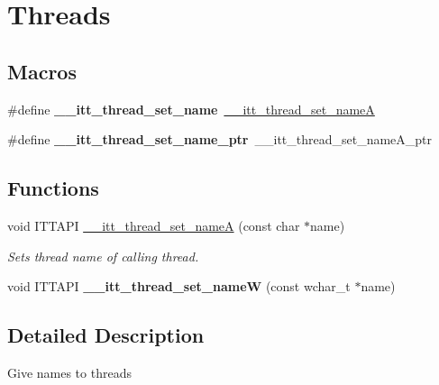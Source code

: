 \hypertarget{group__threads}{}\section{Threads}
\label{group__threads}
\subsection*{Macros}
\begin{DoxyCompactItemize}
\item 
\hypertarget{group__threads_gac8113cf8708e0d665fc9448a3e49c201}{}\#define {\bfseries \+\_\+\+\_\+itt\+\_\+thread\+\_\+set\+\_\+name}~\hyperlink{group__threads_ga9e8c213f65e14aef25280ed07df6c5e2}{\+\_\+\+\_\+itt\+\_\+thread\+\_\+set\+\_\+name\+A}\label{group__threads_gac8113cf8708e0d665fc9448a3e49c201}

\item 
\hypertarget{group__threads_ga995f602e830faca49bd119f4a1fe51d9}{}\#define {\bfseries \+\_\+\+\_\+itt\+\_\+thread\+\_\+set\+\_\+name\+\_\+ptr}~\+\_\+\+\_\+itt\+\_\+thread\+\_\+set\+\_\+name\+A\+\_\+ptr\label{group__threads_ga995f602e830faca49bd119f4a1fe51d9}

\end{DoxyCompactItemize}
\subsection*{Functions}
\begin{DoxyCompactItemize}
\item 
void I\+T\+T\+A\+P\+I \hyperlink{group__threads_ga9e8c213f65e14aef25280ed07df6c5e2}{\+\_\+\+\_\+itt\+\_\+thread\+\_\+set\+\_\+name\+A} (const char $\ast$name)
\begin{DoxyCompactList}\small\item\em Sets thread name of calling thread. \end{DoxyCompactList}\item 
\hypertarget{group__threads_gad5d4b8808f625466329f1145e80eb4be}{}void I\+T\+T\+A\+P\+I {\bfseries \+\_\+\+\_\+itt\+\_\+thread\+\_\+set\+\_\+name\+W} (const wchar\+\_\+t $\ast$name)\label{group__threads_gad5d4b8808f625466329f1145e80eb4be}

\end{DoxyCompactItemize}


\subsection{Detailed Description}
Give names to threads 

